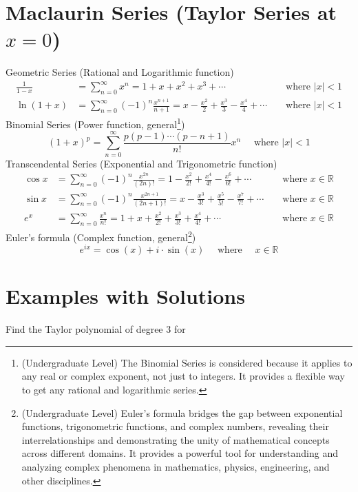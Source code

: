 \section*{Maclaurin Series (Taylor Series at $x=0$)}
Geometric Series (Rational and Logarithmic function)
$$
\begin{aligned}
\frac{1}{1-x} & =\sum_{n=0}^{\infty} x^{n}=1+x+x^{2}+x^{3}+\cdots & & \text { where }|x|<1 \\
\ln (1+x) & =\sum_{n=0}^{\infty}(-1)^{n} \frac{x^{n+1}}{n+1}=x-\frac{x^{2}}{2}+\frac{x^{3}}{3}-\frac{x^{4}}{4}+\cdots & & \text { where }|x|<1
\end{aligned}
$$
Binomial Series (Power function, general\footnote{(Undergraduate Level) The Binomial Series is considered 
 because it applies to any real or complex 
exponent, not just to integers. It provides a flexible way to get 
any rational and logarithmic series.})
$$
(1+x)^{p}=\sum_{n=0}^{\infty} \frac{p(p-1) \cdots(p-n+1)}{n!} x^{n} \quad \text { where }|x|<1
$$
Transcendental Series (Exponential and Trigonometric function)
$$
\begin{aligned}
\cos x & =\sum_{n=0}^{\infty}(-1)^{n} \frac{x^{2 n}}{(2 n)!}=1-\frac{x^{2}}{2!}+\frac{x^{4}}{4!}-\frac{x^{6}}{6!}+\cdots & & \text { where } x \in \mathbb{R} \\
\sin x & =\sum_{n=0}^{\infty}(-1)^{n} \frac{x^{2 n+1}}{(2 n+1)!}=x-\frac{x^{3}}{3!}+\frac{x^{5}}{5!}-\frac{x^{7}}{7!}+\cdots & & \text { where } x \in \mathbb{R} \\
e^{x} & =\sum_{n=0}^{\infty} \frac{x^{n}}{n!}=1+x+\frac{x^{2}}{2!}+\frac{x^{3}}{3!}+\frac{x^{4}}{4!}+\cdots & & \text { where } x \in \mathbb{R}
\end{aligned}
$$
Euler's formula (Complex function, general\footnote{(Undergraduate Level) Euler's formula bridges the 
gap between exponential functions, trigonometric functions, and 
complex numbers, revealing their interrelationships and demonstrating 
the unity of mathematical concepts across different domains. It provides 
a powerful tool for understanding and analyzing complex phenomena in 
mathematics, physics, engineering, and other disciplines.})
$$
e^{i x}=\cos (x)+i \cdot \sin (x) \quad \text { where } \quad x \in \mathbb{R}
$$




\newpage

\section*{Examples with Solutions}
Find the Taylor polynomial of degree 3 for

